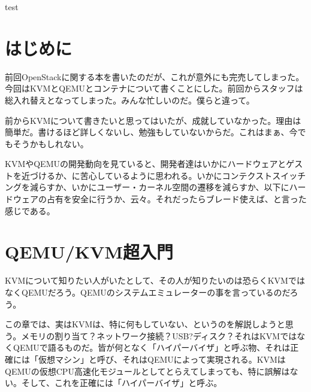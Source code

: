 \documentclass[9pt,b5paper,tombo]{jsbook}
\begin{document}
\enlargethispage{\paperwidth}
\thispagestyle{empty}
\vspace*{-1truein}
\vspace*{-\topmargin}
\vspace*{-\headheight}
\vspace*{-\headsep}
\vspace*{-\topskip}
\noindent\hspace*{-1in}\hspace*{-\oddsidemargin}

\newpage

\thispagestyle{empty}


test

\newpage

\tableofcontents

\chapter{はじめに}

\setcounter{page}{1}

前回OpenStackに関する本を書いたのだが、これが意外にも完売してしまった。今回はKVMとQEMUとコンテナについて書くことにした。前回からスタッフは総入れ替えとなってしまった。みんな忙しいのだ。僕らと違って。

前からKVMについて書きたいと思ってはいたが、成就していなかった。理由は簡単だ。書けるほど詳しくないし、勉強もしていないからだ。これはまぁ、今でもそうかもしれない。

KVMやQEMUの開発動向を見ていると、開発者達はいかにハードウェアとゲストを近づけるか、に苦心しているように思われる。いかにコンテクストスイッチングを減らすか、いかにユーザー・カーネル空間の遷移を減らすか、以下にハードウェアの占有を安全に行うか、云々。それだったらブレード使えば、と言った感じである。

\chapter{QEMU/KVM超入門}

KVMについて知りたい人がいたとして、その人が知りたいのは恐らくKVMではなくQEMUだろう。QEMUのシステムエミュレーターの事を言っているのだろう。

この章では、実はKVMは、特に何もしていない、というのを解説しようと思う。メモリの割り当て？ネットワーク接続？USB?ディスク？それはKVMではなくQEMUで語るものだ。皆が何となく「ハイパーバイザ」と呼ぶ物、それは正確には「仮想マシン」と呼び、それはQEMUによって実現される。KVMはQEMUの仮想CPU高速化モジュールとしてとらえてしまっても、特に誤解はない。そして、これを正確には「ハイパーバイザ」と呼ぶ。
\end{document}
